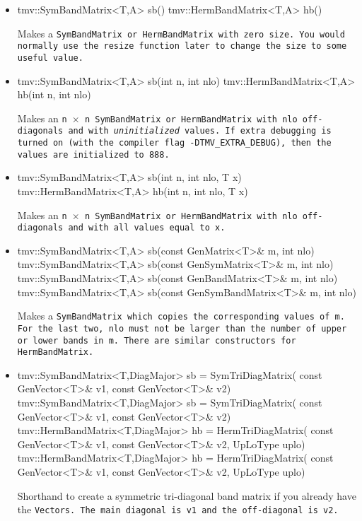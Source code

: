 \begin{itemize}

\item
\begin{tmvcode}
tmv::SymBandMatrix<T,A> sb()
tmv::HermBandMatrix<T,A> hb()
\end{tmvcode}
Makes a \tt{SymBandMatrix} or \tt{HermBandMatrix} with zero size.  You would normally use the \tt{resize} function later to
change the size to some useful value.

\item 
\begin{tmvcode}
tmv::SymBandMatrix<T,A> sb(int n, int nlo)
tmv::HermBandMatrix<T,A> hb(int n, int nlo)
\end{tmvcode}
Makes an \tt{n} $\times$ \tt{n} \tt{SymBandMatrix} or \tt{HermBandMatrix} with 
\tt{nlo} off-diagonals
and with {\em uninitialized} values.
If extra debugging is turned on (with the compiler flag \tt{-DTMV\_EXTRA\_DEBUG}), then the values are initialized to 888.

\item
\begin{tmvcode}
tmv::SymBandMatrix<T,A> sb(int n, int nlo, T x)
tmv::HermBandMatrix<T,A> hb(int n, int nlo, T x)
\end{tmvcode}
Makes an \tt{n} $\times$ \tt{n} \tt{SymBandMatrix}  or \tt{HermBandMatrix} with \tt{nlo} off-diagonals
and with all values equal to \tt{x}.

\item 
\begin{tmvcode}
tmv::SymBandMatrix<T,A> sb(const GenMatrix<T>& m, int nlo)
tmv::SymBandMatrix<T,A> sb(const GenSymMatrix<T>& m, int nlo)
tmv::SymBandMatrix<T,A> sb(const GenBandMatrix<T>& m, int nlo)
tmv::SymBandMatrix<T,A> sb(const GenSymBandMatrix<T>& m, int nlo)
\end{tmvcode}
Makes a \tt{SymBandMatrix} which copies the corresponding values of \tt{m}.  
For the last two, \tt{nlo} must not be larger than the number of upper
or lower bands in \tt{m}.  There are similar constructors for \tt{HermBandMatrix}.

\item
\begin{tmvcode}
tmv::SymBandMatrix<T,DiagMajor> sb = SymTriDiagMatrix(
      const GenVector<T>& v1, const GenVector<T>& v2)
tmv::SymBandMatrix<T,DiagMajor> sb = SymTriDiagMatrix(
      const GenVector<T>& v1, const GenVector<T>& v2)
tmv::HermBandMatrix<T,DiagMajor> hb = HermTriDiagMatrix(
      const GenVector<T>& v1, const GenVector<T>& v2, 
      UpLoType uplo)
tmv::HermBandMatrix<T,DiagMajor> hb = HermTriDiagMatrix(
      const GenVector<T>& v1, const GenVector<T>& v2, 
      UpLoType uplo)
\end{tmvcode}
Shorthand to create a symmetric tri-diagonal band matrix
if you already have the \tt{Vector}s.  
The main diagonal is \tt{v1} and the off-diagonal is \tt{v2}.


\end{itemize}
